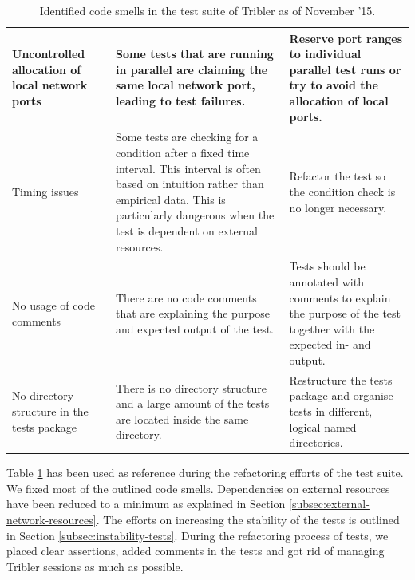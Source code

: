 \begin{table}
\begin{tabularx}{\textwidth}{|X|X|X|}
		Uncontrolled allocation of local network ports & Some tests that are running in parallel are claiming the same local network port, leading to test failures. & Reserve port ranges to individual parallel test runs or try to avoid the allocation of local ports. \\ \hline
		Timing issues & Some tests are checking for a condition after a fixed time interval. This interval is often based on intuition rather than empirical data. This is particularly dangerous when the test is dependent on external resources. & Refactor the test so the condition check is no longer necessary.\\ \hline
		No usage of code comments & There are no code comments that are explaining the purpose and expected output of the test. & Tests should be annotated with comments to explain the purpose of the test together with the expected in- and output. \\ \hline
		No directory structure in the tests package & There is no directory structure and a large amount of the tests are located inside the same directory. & Restructure the tests package and organise tests in different, logical named directories.\\ \hline
	\end{tabularx}
	\caption{Identified code smells in the test suite of Tribler as of November '15.}
	\label{table:tests-code-smells}
\end{table}

Table \ref{table:tests-code-smells} has been used as reference during the refactoring efforts of the test suite. We fixed most of the outlined code smells. Dependencies on external resources have been reduced to a minimum as explained in Section \ref{subsec:external-network-resources}. The efforts on increasing the stability of the tests is outlined in Section \ref{subsec:instability-tests}. During the refactoring process of tests, we placed clear assertions, added comments in the tests and got rid of managing Tribler sessions as much as possible.

